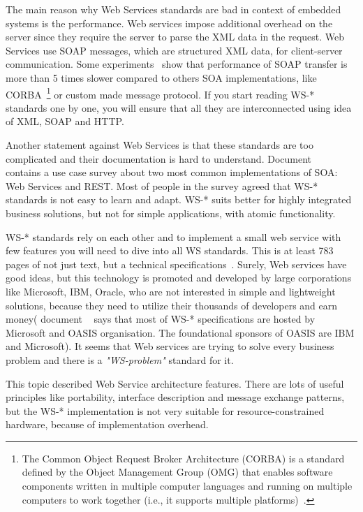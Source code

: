 The main reason why Web Services standards are bad in context of embedded
systems is the performance.
Web services impose additional overhead on the server since they require the
server to parse the XML data in the request. Web Services use SOAP
messages, which are structured XML data, for client-server communication.
Some experiments~\cite{1182978, 5470528} show that performance of SOAP transfer
is more than 5 times slower compared to others SOA implementations, like
CORBA~\footnote{The Common Object Request Broker Architecture (CORBA) is a
standard defined by the Object Management Group (OMG) that enables software
components written in multiple computer languages and running on multiple
computers to work together (i.e., it supports multiple
platforms)~\cite{wikipedia:CORBA}.} or custom made message protocol. If you
start reading WS-* standards one by one, you will ensure that all they are
interconnected using idea of XML, SOAP and HTTP. 


Another statement against Web Services is that these standards are too
complicated and their documentation is hard to
understand. Document ~\cite{dguinard-rest-vs-ws} contains a use case survey
about two most common implementations of SOA: Web Services and REST. Most of people
in the survey agreed that WS-* standards is not easy to learn and adapt. WS-*
suits better for highly integrated business solutions, but not for simple
applications, with atomic functionality.

WS-* standards rely on each other and to implement a small web service with
few features you will need to dive into all WS standards. This is at least 783
pages of not just text, but a technical specifications~\cite{ws_pagecount}.
Surely, Web services have good ideas, but this technology is promoted and
developed by large corporations like Microsoft, IBM, Oracle, who are not
interested in simple and lightweight solutions, because they need to utilize
their thousands of developers and earn money( document ~\cite{ws_pagecount} says
that most of WS-* specifications are hosted by Microsoft and  OASIS
organisation. The foundational sponsors of OASIS are IBM and Microsoft).
It seems that Web services are trying to solve every business problem and there
is a \textit{"WS-problem"} standard for it.


This topic described Web Service architecture features. There are lots of
useful principles like portability, interface description and message exchange
patterns, but the WS-* implementation is not very suitable for resource-constrained
hardware, because of implementation overhead.





